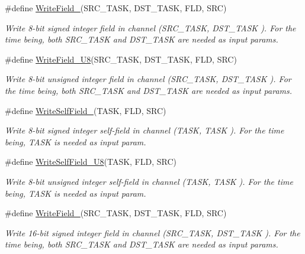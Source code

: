 \begin{DoxyCompactItemize}
\#define \hyperlink{group__interpow__read__write_gafd2f8f99cfe3fccfa2bea3394ed37125}{Write\+Field\+\_}(S\+R\+C\+\_\+\+T\+A\+SK,  D\+S\+T\+\_\+\+T\+A\+SK,  F\+LD,  S\+RC)
\begin{DoxyCompactList}\small\item\em Write 8-\/bit signed integer field in channel ({\itshape S\+R\+C\+\_\+\+T\+A\+SK}, {\itshape D\+S\+T\+\_\+\+T\+A\+SK} ). For the time being, both S\+R\+C\+\_\+\+T\+A\+SK and D\+S\+T\+\_\+\+T\+A\+SK are needed as input params. \end{DoxyCompactList}\item 
\#define \hyperlink{group__interpow__read__write_ga8f0de203ad0e6a2c4b93cb5de74d11f5}{Write\+Field\+\_\+\+U8}(S\+R\+C\+\_\+\+T\+A\+SK,  D\+S\+T\+\_\+\+T\+A\+SK,  F\+LD,  S\+RC)
\begin{DoxyCompactList}\small\item\em Write 8-\/bit unsigned integer field in channel ({\itshape S\+R\+C\+\_\+\+T\+A\+SK}, {\itshape D\+S\+T\+\_\+\+T\+A\+SK} ). For the time being, both S\+R\+C\+\_\+\+T\+A\+SK and D\+S\+T\+\_\+\+T\+A\+SK are needed as input params. \end{DoxyCompactList}\item 
\#define \hyperlink{group__interpow__read__write_ga4a8d4891f309ee7ad151829addbb2f9b}{Write\+Self\+Field\+\_}(T\+A\+SK,  F\+LD,  S\+RC)
\begin{DoxyCompactList}\small\item\em Write 8-\/bit signed integer self-\/field in channel ({\itshape T\+A\+SK}, {\itshape T\+A\+SK} ). For the time being, T\+A\+SK is needed as input param. \end{DoxyCompactList}\item 
\#define \hyperlink{group__interpow__read__write_ga3ccf9342cdc5059a8657527baec91f75}{Write\+Self\+Field\+\_\+\+U8}(T\+A\+SK,  F\+LD,  S\+RC)
\begin{DoxyCompactList}\small\item\em Write 8-\/bit unsigned integer self-\/field in channel ({\itshape T\+A\+SK}, {\itshape T\+A\+SK} ). For the time being, T\+A\+SK is needed as input param. \end{DoxyCompactList}\item 
\#define \hyperlink{group__interpow__read__write_ga8a1d2a8ec6e0ac991ad5ed6c18c9c07a}{Write\+Field\+\_}(S\+R\+C\+\_\+\+T\+A\+SK,  D\+S\+T\+\_\+\+T\+A\+SK,  F\+LD,  S\+RC)
\begin{DoxyCompactList}\small\item\em Write 16-\/bit signed integer field in channel ({\itshape S\+R\+C\+\_\+\+T\+A\+SK}, {\itshape D\+S\+T\+\_\+\+T\+A\+SK} ). For the time being, both S\+R\+C\+\_\+\+T\+A\+SK and D\+S\+T\+\_\+\+T\+A\+SK are needed as input params. \end{DoxyCompactList}\item 

\end{DoxyCompactItemize}
